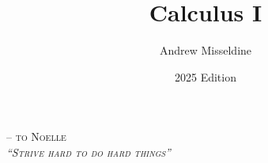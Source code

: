 \documentclass{book}
\begin{document}
{}



\mbox{}\vfill
{}
\vfill\mbox{}\pagebreak\pagebreak

\mbox{}\vspace{25pt}
\begin{center}
\huge \scshape -- to Noelle\\
\itshape ``Strive hard to do hard things''
\end{center}\pagebreak


\date{2025 Edition}

\aboutAndrew

\title{Calculus I}
\author{Andrew Misseldine}
\maketitle

\tableofcontents
\end{document}
